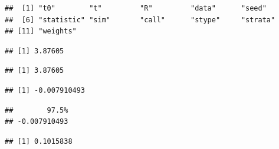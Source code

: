 \begin{knitrout}
\begin{kframe}
\begin{alltt}
\end{alltt}
\begin{verbatim}
##  [1] "t0"        "t"         "R"         "data"      "seed"
##  [6] "statistic" "sim"       "call"      "stype"     "strata"
## [11] "weights"
\end{verbatim}
\begin{alltt}
\hlstd{(}
\end{alltt}
\begin{verbatim}
## [1] 3.87605
\end{verbatim}
\begin{alltt}
\hlopt{$}
\end{alltt}
\begin{verbatim}
## [1] 3.87605
\end{verbatim}
\begin{alltt}
\hlopt{$} \hlopt{-} \hlopt{$}
\end{alltt}
\begin{verbatim}
## [1] -0.007910493
\end{verbatim}
\begin{alltt}
\hlstd{(}\hlopt{$} \hlopt{-} \hlopt{$}\hlstd{)}
\end{alltt}
\begin{verbatim}
##        97.5%
## -0.007910493
\end{verbatim}
\begin{alltt}
\hlopt{$}
\end{alltt}
\begin{verbatim}
## [1] 0.1015838
\end{verbatim}
\begin{alltt}
\end{alltt}
\end{kframe}

\end{knitrout}
